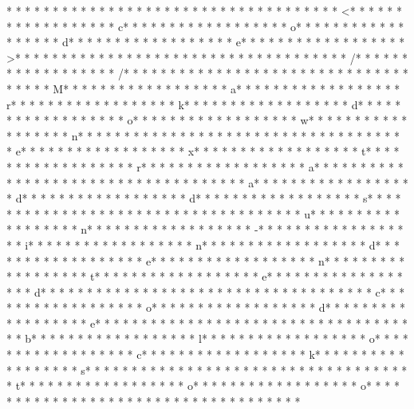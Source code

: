 * * *  * * *  * * *  *  * * *  *  * * *  * 	* * *  * * *  * * *  *  * * *  *  * * *  * <* * *  * * *  * * *  *  * * *  *  * * *  * c* * *  * * *  * * *  *  * * *  *  * * *  * o* * *  * * *  * * *  *  * * *  *  * * *  * d* * *  * * *  * * *  *  * * *  *  * * *  * e* * *  * * *  * * *  *  * * *  *  * * *  * >* * *  * * *  * * *  *  * * *  *  * * *  * 
* * *  * * *  * * *  *  * * *  *  * * *  * /* * *  * * *  * * *  *  * * *  *  * * *  * /* * *  * * *  * * *  *  * * *  *  * * *  *  * * *  * * *  * * *  *  * * *  *  * * *  * M* * *  * * *  * * *  *  * * *  *  * * *  * a* * *  * * *  * * *  *  * * *  *  * * *  * r* * *  * * *  * * *  *  * * *  *  * * *  * k* * *  * * *  * * *  *  * * *  *  * * *  * d* * *  * * *  * * *  *  * * *  *  * * *  * o* * *  * * *  * * *  *  * * *  *  * * *  * w* * *  * * *  * * *  *  * * *  *  * * *  * n* * *  * * *  * * *  *  * * *  *  * * *  *  * * *  * * *  * * *  *  * * *  *  * * *  * e* * *  * * *  * * *  *  * * *  *  * * *  * x* * *  * * *  * * *  *  * * *  *  * * *  * t* * *  * * *  * * *  *  * * *  *  * * *  * r* * *  * * *  * * *  *  * * *  *  * * *  * a* * *  * * *  * * *  *  * * *  *  * * *  *  * * *  * * *  * * *  *  * * *  *  * * *  * a* * *  * * *  * * *  *  * * *  *  * * *  * d* * *  * * *  * * *  *  * * *  *  * * *  * d* * *  * * *  * * *  *  * * *  *  * * *  * s* * *  * * *  * * *  *  * * *  *  * * *  *  * * *  * * *  * * *  *  * * *  *  * * *  * u* * *  * * *  * * *  *  * * *  *  * * *  * n* * *  * * *  * * *  *  * * *  *  * * *  * -* * *  * * *  * * *  *  * * *  *  * * *  * i* * *  * * *  * * *  *  * * *  *  * * *  * n* * *  * * *  * * *  *  * * *  *  * * *  * d* * *  * * *  * * *  *  * * *  *  * * *  * e* * *  * * *  * * *  *  * * *  *  * * *  * n* * *  * * *  * * *  *  * * *  *  * * *  * t* * *  * * *  * * *  *  * * *  *  * * *  * e* * *  * * *  * * *  *  * * *  *  * * *  * d* * *  * * *  * * *  *  * * *  *  * * *  *  * * *  * * *  * * *  *  * * *  *  * * *  * c* * *  * * *  * * *  *  * * *  *  * * *  * o* * *  * * *  * * *  *  * * *  *  * * *  * d* * *  * * *  * * *  *  * * *  *  * * *  * e* * *  * * *  * * *  *  * * *  *  * * *  *  * * *  * * *  * * *  *  * * *  *  * * *  * b* * *  * * *  * * *  *  * * *  *  * * *  * l* * *  * * *  * * *  *  * * *  *  * * *  * o* * *  * * *  * * *  *  * * *  *  * * *  * c* * *  * * *  * * *  *  * * *  *  * * *  * k* * *  * * *  * * *  *  * * *  *  * * *  * s* * *  * * *  * * *  *  * * *  *  * * *  *  * * *  * * *  * * *  *  * * *  *  * * *  * t* * *  * * *  * * *  *  * * *  *  * * *  * o* * *  * * *  * * *  *  * * *  *  * * *  * o* * *  * * *  * * *  *  * * *  *  * * *  * 
* * *  * * *  * * *  *  * * *  *  * * *  * 

